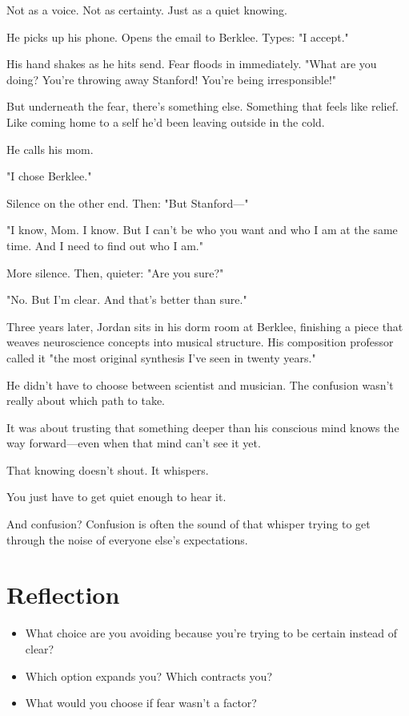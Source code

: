 \documentclass[11pt,twoside]{book}
\begin{document}
Not as a voice. Not as certainty. Just as a quiet knowing.

He picks up his phone. Opens the email to Berklee. Types: "I accept."

His hand shakes as he hits send. Fear floods in immediately. "What are you doing? You're throwing away Stanford! You're being irresponsible!"

But underneath the fear, there's something else. Something that feels like relief. Like coming home to a self he'd been leaving outside in the cold.

He calls his mom.

"I chose Berklee."

Silence on the other end. Then: "But Stanford—"

"I know, Mom. I know. But I can't be who you want and who I am at the same time. And I need to find out who I am."

More silence. Then, quieter: "Are you sure?"

"No. But I'm clear. And that's better than sure."

Three years later, Jordan sits in his dorm room at Berklee, finishing a piece that weaves neuroscience concepts into musical structure. His composition professor called it "the most original synthesis I've seen in twenty years."

He didn't have to choose between scientist and musician. The confusion wasn't really about which path to take.

It was about trusting that something deeper than his conscious mind knows the way forward—even when that mind can't see it yet.

That knowing doesn't shout. It whispers.

You just have to get quiet enough to hear it.

And confusion? Confusion is often the sound of that whisper trying to get through the noise of everyone else's expectations.

\section*{Reflection}

\begin{itemize}
\item What choice are you avoiding because you're trying to be certain instead of clear?
\item Which option expands you? Which contracts you?
\item What would you choose if fear wasn't a factor?
\end{itemize}
\end{document}
